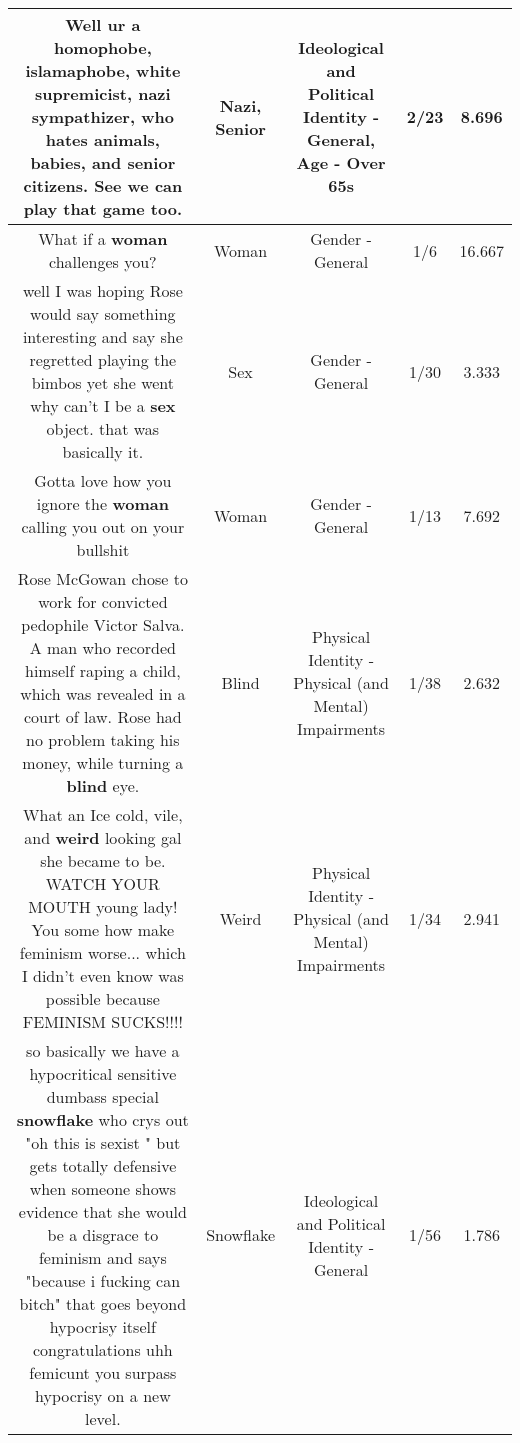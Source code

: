 \documentclass[11pt]{article}
\newlength\mylength
\begin{document}
\begin{center}
\begin{longtable}{|C{.65\mylength}|C{.30\mylength}|C{.12\mylength}|C{.12\mylength}|C{.12\mylength}|}
  \small Well ur a homophobe, islamaphobe, white supremicist, \textbf{nazi} sympathizer, who hates animals, babies, and \textbf{senior} citizens.  See we can play that game too.\normalsize   & Nazi, Senior &  Ideological and Political Identity - General, Age - Over 65s & 2/23 & 8.696 \\  \hline
  \small What if a \textbf{woman} challenges you?\normalsize   & Woman & Gender - General & 1/6 & 16.667 \\  \hline
  \small well I was hoping Rose would say something interesting and say she regretted playing the bimbos yet she went why can't I be a \textbf{sex} object. that was basically it.\normalsize   & Sex & Gender - General & 1/30 & 3.333 \\  \hline
  \small Gotta love how you ignore the \textbf{woman} calling you out on your bullshit\normalsize   & Woman & Gender - General & 1/13 & 7.692 \\  \hline
  \small Rose McGowan chose to work for convicted pedophile Victor Salva. A man who recorded himself raping a child, which was revealed in a court of law. Rose had no problem taking his money, while turning a \textbf{blind} eye.\normalsize   & Blind & Physical Identity - Physical (and Mental) Impairments & 1/38 & 2.632 \\  \hline
  \small What an Ice cold, vile, and \textbf{weird} looking gal she became to be.  WATCH YOUR MOUTH young lady!  You some how make feminism worse... which I didn't even know was possible because FEMINISM SUCKS!!!!\normalsize   & Weird & Physical Identity - Physical (and Mental) Impairments & 1/34 & 2.941 \\  \hline
  \small so basically we have a hypocritical sensitive dumbass special \textbf{snowflake}  who crys out "oh this is sexist " but gets totally defensive when someone shows evidence that she would be a disgrace to feminism  and says "because i fucking can bitch" that goes beyond hypocrisy itself congratulations uhh femicunt you surpass hypocrisy on a new level.\normalsize   & Snowflake &  Ideological and Political Identity - General & 1/56 & 1.786 \\  \hline

\end{longtable}
\end{center}
\end{document}
